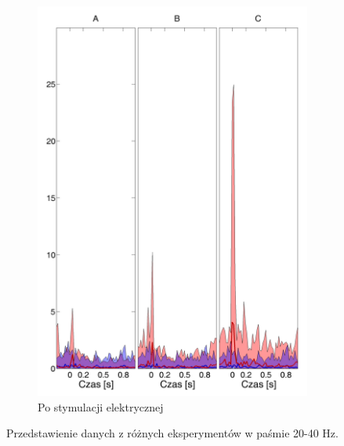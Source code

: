 \documentclass{pracamgr_2}
\begin{document}
\begin{figure}[h]
\begin{subfigure}{.5\textwidth}
			\includegraphics[width=1.\linewidth]{beta3_20-40_z_CxC5_do_LGN42.png}
			\caption{Po stymulacji elektrycznej}
			\label{rys:20_40_beta_CxC_LGN}
		\end{subfigure}
		\caption{Przedstawienie danych z różnych eksperymentów w paśmie 20-40 Hz.}
		\label{rys:20_40_CxC_LGN}
	\end{figure}
	\FloatBarrier
\end{document}

